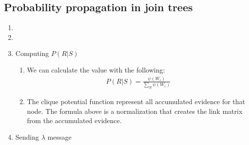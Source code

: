 \documentclass[12pt,twoside]{article}
\begin{document}
\subsection{Probability propagation in join trees}
\begin{enumerate}
\item 
\item
\item Computing $P(R\vert S)$
	\begin{enumerate}
	\item We can calculate the value with the following:
		\begin{align*}
			P(R\vert S) = \frac{\psi(W_i)}{\sum_R\psi(W_i)}
		\end{align*}
		
	\item The clique potential function represent all accumulated evidence for that node. The formula above is a normalization that creates the link matrix from the accumulated evidence.
	\end{enumerate}

\item Sending $\lambda$ message

\end{enumerate}
\end{document}
